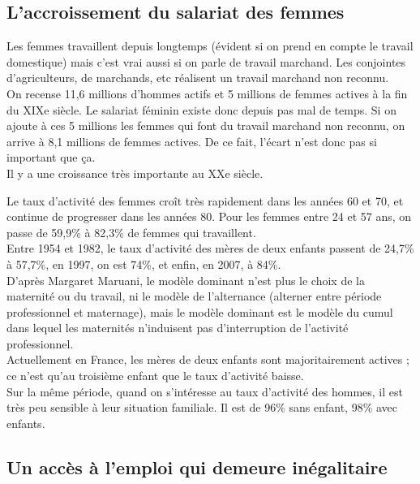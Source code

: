 \documentclass[12pt, a4paper, openany]{book}
\begin{document}
\subsection{L'accroissement du salariat des femmes}

Les femmes travaillent depuis longtemps (évident si on prend en compte le travail domestique) mais c'est vrai aussi si on parle de travail marchand. Les conjointes d'agriculteurs, de marchands, etc réalisent un travail marchand non reconnu. \\
On recense 11,6 millions d'hommes actifs et 5 millions de femmes actives à la fin du XIXe siècle. Le salariat féminin existe donc depuis pas mal de temps. Si on ajoute à ces 5 millions les femmes qui font du travail marchand non reconnu, on arrive à 8,1 millions de femmes actives. De ce fait, l'écart n'est donc pas si important que ça. \\
Il y a une croissance très importante au XXe siècle.


Le taux d'activité des femmes croît très rapidement dans les années 60 et 70, et continue de progresser dans les années 80. Pour les femmes entre 24 et 57 ans, on passe de 59,9\% à 82,3\% de femmes qui travaillent. \\
Entre 1954 et 1982, le taux d'activité des mères de deux enfants passent de 24,7\% à 57,7\%, en 1997, on est 74\%, et enfin, en 2007, à 84\%. \\
D'après Margaret Maruani, le modèle dominant n'est plus le choix de la maternité ou du travail, ni le modèle de l'alternance (alterner entre période professionnel et maternage), mais le modèle dominant est le modèle du cumul dans lequel les maternités n'induisent pas d'interruption de l'activité professionnel. \\
Actuellement en France, les mères de deux enfants sont majoritairement actives ; ce n'est qu'au troisième enfant que le taux d'activité baisse. \\
Sur la même période, quand on s'intéresse au taux d'activité des hommes, il est très peu sensible à leur situation familiale. Il est de 96\% sans enfant, 98\% avec enfants.  


\subsection{Un accès à l'emploi qui demeure inégalitaire}
\end{document}
